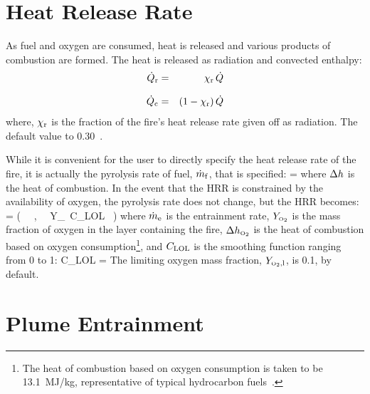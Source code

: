 \section{Heat Release Rate}

As fuel and oxygen are consumed, heat is released and various products of combustion are formed. The heat is released as radiation and convected enthalpy:
\begin{eqnarray}
   \dot{Q}_{\rm r} &=& \chi_{\rm r} \, \dot{Q} \\[.1in]
   \dot{Q}_{\rm c} &=& (1-\chi_{\rm r}) \, \dot{Q}
\end{eqnarray}
where, $\chi_{\rm r}$ is the fraction  of the fire's heat release rate given off as radiation. The default value to 0.30~\cite{Drysdale:1985}.

While it is convenient for the user to directly specify the heat release rate of the fire, it is actually the pyrolysis rate of fuel, $\dot{m}_{\rm f}$, that is specified:
\be
   \dmf = \frac{\dQ}{\Dh}
\ee
where $\Delta h$ is the heat of combustion. In the event that the HRR is constrained by the availability of oxygen, the pyrolysis rate does not change, but the HRR becomes:
\be
   \dQ = \min \Big( \dmf \, \Dh \, , \, \dme \, Y_\OTWO \, C_{\rm LOL} \, \DhO \Big)
\ee
where $\dot{m}_{\rm e}$ is the entrainment rate, $Y_{\tiny \hbox{O}_2}$ is the mass fraction of oxygen in the layer containing the fire, $\Delta h_{\tiny \hbox{O}_2}$ is the heat of combustion based on oxygen consumption\footnote{The heat of combustion based on oxygen consumption is taken to be 13.1~MJ/kg, representative of typical hydrocarbon fuels~\cite{Huggett:1980}.}, and $C_{\rm LOL}$ is the smoothing function ranging from 0 to 1:
\be
   C_{\rm LOL} = 
\ee
The limiting oxygen mass fraction, $Y_{{\tiny \hbox{O}_2},{\rm l}}$, is 0.1, by default.



\section{Plume Entrainment}

